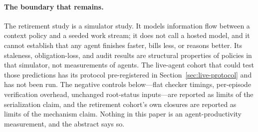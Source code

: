 \paragraph{The boundary that remains.}
The retirement study is a simulator study. It models information flow
between a context policy and a seeded work stream; it does not call a
hosted model, and it cannot establish that any agent finishes faster,
bills less, or reasons better. Its staleness, obligation-loss, and
audit results are structural properties of policies in that
simulator, not
measurements of agents. The live-agent cohort that could test those
predictions has its protocol pre-registered in
Section~\ref{sec:live-protocol} and has not been run. The negative
controls below---flat checker timings, per-episode verification
overhead, unchanged root-status inputs---are reported as limits of
the serialization claim, and the retirement cohort's own closures are
reported as limits of the mechanism claim. Nothing in this paper is
an agent-productivity measurement, and the abstract says so.

